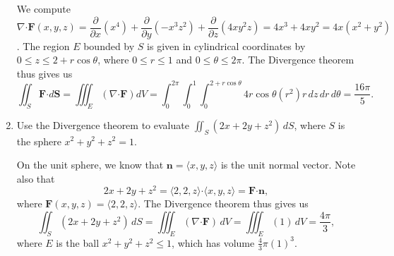\documentclass[letterpaper,12pt]{article}
\newcommand{\pd}[2]{\dfrac{\partial #1}{\partial #2}}
\newcommand{\dotp}{\boldsymbol{\cdot}}
\newcommand{\F}{\mathbf{F}}
\renewcommand{\S}{\mathbf{S}}
\begin{document}
\begin{enumerate}
We compute $\nabla\dotp\F(x,y,z) = \pd{}{x}(x^4)+\pd{}{y}(-x^3z^2)+\pd{}{z}(4xy^2z) = 4x^3+4xy^2 = 4x(x^2+y^2)$. The region $E$ bounded by $S$ is given in cylindrical coordinates by $0\leq z\leq 2+r\cos\theta$, where $0\leq r\leq 1$ and $0\leq \theta \leq 2\pi$. The Divergence theorem thus gives us
\[
 \iint_S \F\dotp d\S = \iiint_E (\nabla\dotp\F)dV = \int_0^{2\pi}\int_0^1\int_0^{2+r\cos\theta}4r\cos\theta(r^2)r\,dz\,dr\,d\theta = \frac{16\pi}{5}.
\]
 
 \item Use the Divergence theorem to evaluate $\iint_S(2x+2y+z^2)\,dS$, where $S$ is the sphere $x^2+y^2+z^2=1$.

\bigskip

On the unit sphere, we know that $\mathbf{n} = \langle x, y, z\rangle$ is the unit normal vector. Note also that
\[
 2x+2y+z^2 = \langle 2, 2, z\rangle\dotp \langle x, y, z\rangle = \F\dotp \mathbf{n},
\]
where $\F(x,y,z) = \langle 2, 2, z\rangle$. The Divergence theorem thus gives us
\[
 \iint_S(2x+2y+z^2)\,dS = \iiint_E (\nabla\dotp\F)\,dV = \iiint_E (1) \,dV = \frac{4\pi}{3},
\]
where $E$ is the ball $x^2+y^2+z^2\leq 1$, which has volume $\frac{4}{3}\pi(1)^3$.
\end{enumerate}
\end{document}
